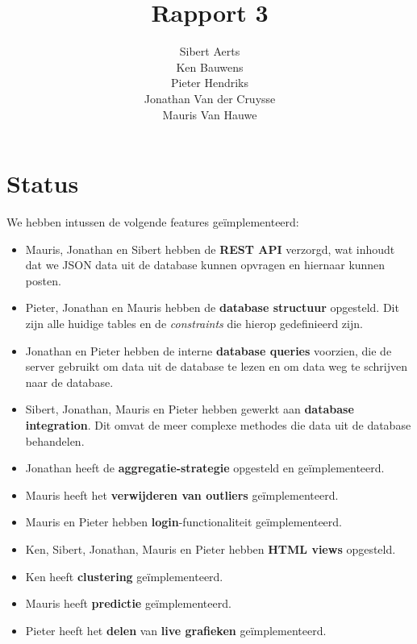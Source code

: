 \documentclass[12pt,parskip=full]{article}
\begin{document}
\title{Rapport 3}
\author{Sibert Aerts \\ Ken Bauwens \\ Pieter Hendriks \\ Jonathan Van der Cruysse \\ Mauris Van Hauwe}
\maketitle

\newcommand{\code}[1]{\texttt{#1}}
%
\newcommand{\CS}{{C\#}}
\lstset{language=[Sharp]C,basicstyle=\ttfamily}

\section{Status}
We hebben intussen de volgende features ge\"implementeerd:

\begin{itemize}
\item Mauris, Jonathan en Sibert hebben de \textbf{REST API} verzorgd, wat
inhoudt dat we JSON data uit de database kunnen opvragen en hiernaar
kunnen posten.

\item Pieter, Jonathan en Mauris hebben de \textbf{database structuur}
opgesteld. Dit zijn alle huidige tables en de \textit{constraints} die hierop gedefinieerd zijn.

\item Jonathan en Pieter hebben de interne \textbf{database queries} voorzien,
die de server gebruikt om data uit de database te lezen en om data weg te
schrijven naar de database.

\item Sibert, Jonathan, Mauris en Pieter hebben gewerkt aan \textbf{database
integration}. Dit omvat de meer complexe methodes die data uit de database
behandelen.

\item Jonathan heeft de \textbf{aggregatie-strategie} opgesteld en ge\"implementeerd.

\item Mauris heeft het \textbf{verwijderen van outliers} ge\"implementeerd.

\item Mauris en Pieter hebben \textbf{login}-functionaliteit ge\"implementeerd.

\item Ken, Sibert, Jonathan, Mauris en Pieter hebben \textbf{HTML views} opgesteld.

\item Ken heeft \textbf{clustering} ge\"implementeerd.

\item Mauris heeft \textbf{predictie} ge\"implementeerd.

\item Pieter heeft het \textbf{delen} van \textbf{live grafieken} ge\"implementeerd.

\end{itemize}
\end{document}
